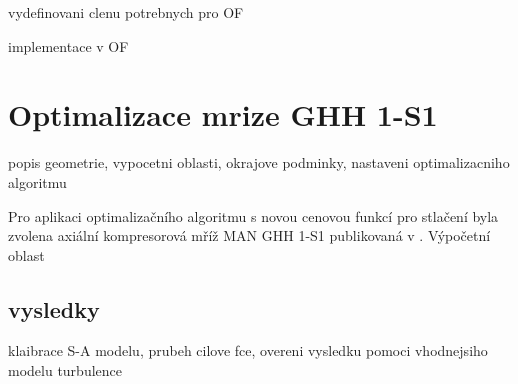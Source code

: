 vydefinovani clenu potrebnych pro OF

implementace v OF 


\section{Optimalizace mrize GHH 1-S1}

popis geometrie, vypocetni oblasti, okrajove podminky, nastaveni optimalizacniho algoritmu

Pro aplikaci optimalizačního algoritmu s novou cenovou funkcí pro stlačení byla zvolena axiální kompresorová mříž MAN GHH 1-S1 publikovaná v \cite{steinert1990design}. Výpočetní oblast 

\subsection{vysledky}
klaibrace S-A modelu, prubeh cilove fce, overeni vysledku pomoci vhodnejsiho modelu turbulence
